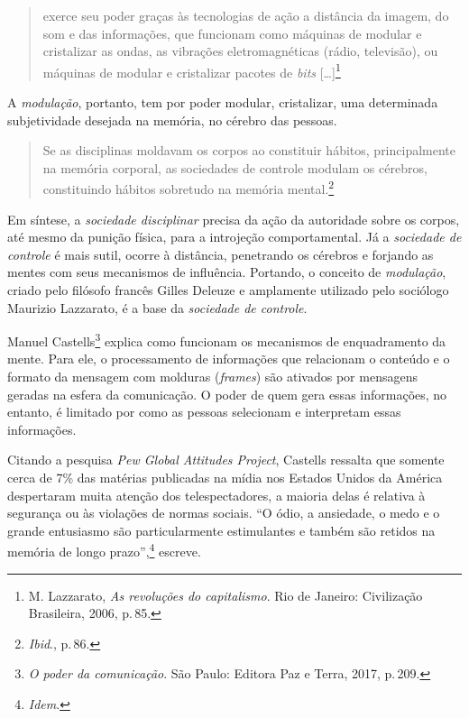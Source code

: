\begin{quote}
exerce seu poder graças às tecnologias de ação a distância da imagem, do
som e das informações, que funcionam como máquinas de modular e
cristalizar as ondas, as vibrações eletromagnéticas (rádio, televisão),
ou máquinas de modular e cristalizar pacotes de \textit{bits} {[}\ldots{}{]}\footnote{M. Lazzarato, \textit{As revoluções do capitalismo}. Rio de Janeiro: Civilização
Brasileira, 2006, p.\,85.}
\end{quote}

A \textit{modulação}, portanto, tem por poder modular, cristalizar, uma
determinada subjetividade desejada na memória, no cérebro das pessoas.

\begin{quote}
Se as disciplinas moldavam os corpos ao constituir hábitos,
principalmente na memória corporal, as sociedades de controle modulam os
cérebros, constituindo hábitos sobretudo na memória mental.\footnote{\textit{Ibid}., p.\,86.}
\end{quote}

Em síntese, a \textit{sociedade disciplinar} precisa da ação da autoridade
sobre os corpos, até mesmo da punição física, para a introjeção
comportamental. Já a \textit{sociedade de controle} é mais sutil, ocorre à
distância, penetrando os cérebros e forjando as mentes com seus
mecanismos de influência. Portando, o conceito de \textit{modulação},
criado pelo filósofo francês Gilles Deleuze e amplamente utilizado pelo
sociólogo Maurizio Lazzarato, é a base da \textit{sociedade de controle}.

Manuel Castells\footnote{\textit{O poder da comunicação}.
São Paulo: Editora Paz e Terra, 2017, p.\,209.} explica como funcionam os mecanismos de
enquadramento da mente. Para ele, o processamento de informações que
relacionam o conteúdo e o formato da mensagem com molduras
(\textit{frames}) são ativados por mensagens geradas na esfera da
comunicação. O poder de quem gera essas informações, no entanto, é
limitado por como as pessoas selecionam e interpretam essas informações.

Citando a pesquisa \textit{Pew Global Attitudes Project}, Castells
ressalta que somente cerca de 7\% das matérias publicadas na mídia nos
Estados Unidos da América despertaram muita atenção dos telespectadores,
a maioria delas é relativa à segurança ou às violações de normas
sociais. ``O ódio, a ansiedade, o medo e o grande entusiasmo são
particularmente estimulantes e também são retidos na memória de longo
prazo'',\footnote{\textit{Idem}.} escreve. 

